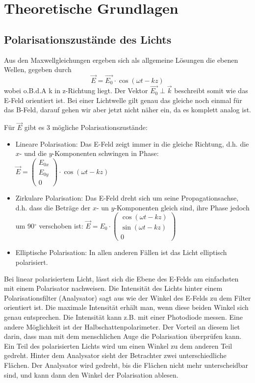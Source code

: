 \section{Theoretische Grundlagen}

\subsection{Polarisationszustände des Lichts}

Aus den Maxwellgleichungen ergeben sich als allgemeine Lösungen die ebenen Wellen, gegeben durch
$$\vec E = \vec{E_0}\cdot \cos(\omega t - kz)$$
wobei o.B.d.A k in z-Richtung liegt. Der Vektor $\vec{E_0} \perp \vec k$ beschreibt somit wie das E-Feld orientiert ist. Bei einer Lichtwelle gilt genau das gleiche noch einmal für das B-Feld, darauf gehen wir aber jetzt nicht näher ein, da es komplett analog ist.

Für $\vec{E}$ gibt es 3 mögliche Polarisationszustände:

\begin{itemize}

\item Lineare Polarisation: Das E-Feld zeigt immer in die gleiche Richtung, d.h. die $x$- und die $y$-Komponenten schwingen in Phase:
$ \vec{E} = \begin{pmatrix} E_{0x} \\ E_{0y} \\ 0 \end{pmatrix}\cdot\cos(\omega t-kz) $

\item Zirkulare Polarisation: Das E-Feld dreht sich um seine Propagationsachse, d.h. dass die Beträge der $x$- un $y$-Komponenten gleich sind, ihre Phase jedoch um 90$^\circ$ verschoben ist:
$\vec{E}= E_0\cdot \begin{pmatrix} \cos(\omega t - kz) \\ \sin(\omega t - kz) \\ 0 \end{pmatrix}$

\item Elliptische Polarisation: In allen anderen Fällen ist das Licht elliptisch polarisiert.
\end{itemize}

Bei linear polarisiertem Licht, lässt sich die Ebene des E-Felds am einfachsten mit einem Polarisator nachweisen. Die Intensität des Lichts hinter einem Polarisationsfilter (Analysator) sagt aus wie der Winkel des E-Felds zu dem Filter orientiert ist. Die maximale Intensität erhält man, wenn diese beiden Winkel sich genau entsprechen. Die Intensität kann z.B. mit einer Photodiode messen.
Eine andere Möglichkeit ist der Halbschattenpolarimeter. Der Vorteil an diesem liet darin, dass man mit dem menschlichen Auge die Polarisation überprüfen kann. Ein Teil des polarisierten Lichts wird um einen Winkel zu dem anderen Teil gedreht. Hinter dem Analysator sieht der Betrachter zwei unterschiedliche Flächen. Der Analysator wird gedreht, bis die Flächen nicht mehr unterscheidbar sind, und kann dann den Winkel der Polarisation ablesen.




